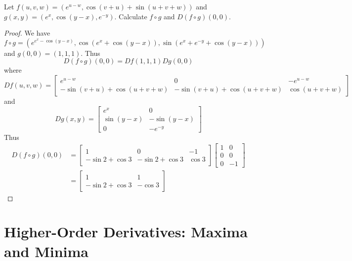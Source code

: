 \documentclass[openany]{book}
\begin{document}
\begin{prob}[2.5, Q8]
    Let \( f(u, v, w) = (e^{u-w}, \cos (v + u) + \sin (u + v + w)) \) and \( g(x, y) = (e^x, \cos (y - x), e^{-y}). \)  
   Calculate \( f \circ g \) and \( D(f \circ g)(0, 0)\).
\end{prob}
\begin{proof}
    We have 
    \begin{equation*}
        f\circ g =(e^{e^x-\cos(y-x)}, \cos(e^x+\cos(y-x)), \sin(e^{x}+e^{-y}+\cos(y-x)))
    \end{equation*}
    and $g(0,0)=(1, 1, 1)$. Thus 
    \begin{equation*}
        D(f\circ g)(0,0)=Df(1,1,1)Dg(0,0)
    \end{equation*}
    where 
    \begin{equation*}
        Df(u,v,w)=\begin{bmatrix}
            e^{u-w}&0&-e^{u-w}\\
            -\sin(v+u)+\cos(u+v+w)&-\sin(v+u)+\cos(u+v+w)&\cos(u+v+w)
        \end{bmatrix}
    \end{equation*}
    and 
    \begin{equation*}
        Dg(x,y)=\begin{bmatrix}
            e^x&0\\
            \sin(y-x)&-\sin(y-x)\\
            0&-e^{-y}
        \end{bmatrix}
    \end{equation*}
    Thus 
    \begin{align*}
        D(f\circ g)(0,0)&=\begin{bmatrix}
            1&0&-1\\
            -\sin 2+\cos 3&-\sin 2+\cos 3&\cos 3
        \end{bmatrix}\begin{bmatrix}
            1&0\\
            0&0\\
            0&-1
        \end{bmatrix}\\
        &=\begin{bmatrix}
            1&1\\
            -\sin 2+\cos 3&-\cos 3
        \end{bmatrix}
    \end{align*}
\end{proof}


\chapter{Higher-Order Derivatives: Maxima and Minima}
\end{document}
